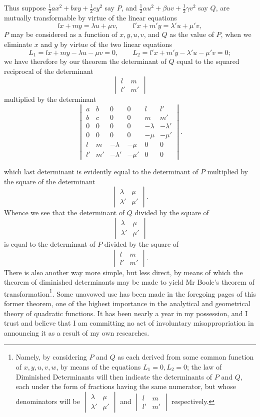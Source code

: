 \documentclass[11pt]{article}
\newcommand{\sourcepage}[1]{\marginpar{\scriptsize p.~#1}}
\begin{document}
{{Thus suppose $\frac12 ax^2+bxy+\frac12 cy^2$ say $P$, and $\frac12\alpha u^2+\beta uv+\frac12\gamma v^2$ say $Q$, are mutually transformable by virtue of the linear equations
\[
lx+my=\lambda u+\mu v,\qquad
l'x+m'y=\lambda'u+\mu'v,
\]
$P$ may be considered as a function of $x,y,u,v$, and $Q$ as the value of $P$, when we eliminate $x$ and $y$ by virtue of the two linear equations
\[
L_1=lx+my-\lambda u-\mu v=0,\qquad
L_2=l'x+m'y-\lambda'u-\mu'v=0;
\]
we have therefore by our theorem the determinant of $Q$ equal to the squared reciprocal of the determinant
\[
\begin{vmatrix}l&m\\ l'&m'\end{vmatrix}
\]
multiplied by the determinant
\[
\begin{vmatrix}
a&b&0&0&l&l'\\
b&c&0&0&m&m'\\
0&0&0&0&-\lambda&-\lambda'\\
0&0&0&0&-\mu&-\mu'\\
l&m&-\lambda&-\mu&0&0\\
l'&m'&-\lambda'&-\mu'&0&0
\end{vmatrix}.
\]

\sourcepage{137}
which last determinant is evidently equal to the determinant of $P$ multiplied by the square of the determinant
\[
\begin{vmatrix}\lambda&\mu\\ \lambda'&\mu'\end{vmatrix}.
\]
Whence we see that the determinant of $Q$ divided by the square of
\[
\begin{vmatrix}\lambda&\mu\\ \lambda'&\mu'\end{vmatrix}
\]
is equal to the determinant of $P$ divided by the square of
\[
\begin{vmatrix}l&m\\ l'&m'\end{vmatrix}.
\]
There is also another way more simple, but less direct, by means of which the theorem of diminished determinants may be made to yield Mr Boole's theorem of transformation\footnote{Namely, by considering $P$ and $Q$ as each derived from some common function of $x,y,u,v,w$, by means of the equations $L_1=0,L_2=0$; the law of Diminished Determinants will then indicate the determinants of $P$ and $Q$, each under the form of fractions having the same numerator, but whose denominators will be $\begin{vmatrix}\lambda&\mu\\ \lambda'&\mu'\end{vmatrix}$ and $\begin{vmatrix}l&m\\ l'&m'\end{vmatrix}$ respectively.}. Some unavowed use has been made in the foregoing pages of this former theorem, one of the highest importance in the analytical and geometrical theory of quadratic functions. It has been nearly a year in my possession, and I trust and believe that I am committing no act of involuntary misappropriation in announcing it as a result of my own researches.

}}
\end{document}
